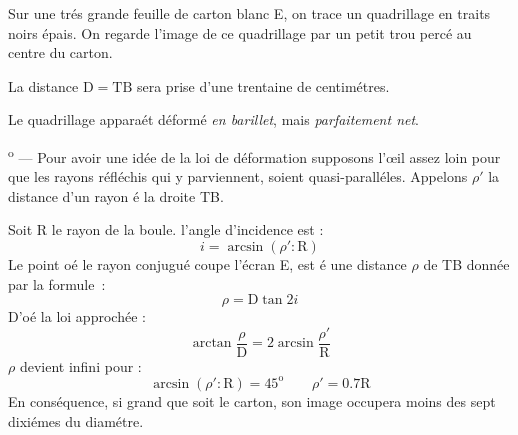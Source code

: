 \documentclass[11pt,frenchb,BCOR10mm,DIV12,bibliography=totoc,parskip=false,smallheadings
    headexclude,footexclude,oneside]{pst-doc}
\newcounter{boua}
\newcommand\itemBoua{\addtocounter{boua}{1}\strut\indent\textit{\theboua}\textsuperscript{o} --- }
\begin{document}
Sur une trés grande feuille de carton blanc E, on trace un
quadrillage en traits noirs épais. On regarde l'image de ce
quadrillage par un petit trou percé au centre du carton.

La distance $\mathrm{D=TB}$ sera prise d'une trentaine de
centimétres.

Le quadrillage apparaét déformé \textit{en barillet}, mais
\textit{parfaitement net}.

\itemBoua
Pour avoir une idée de la loi de déformation supposons l'\oe{}il
assez loin pour que les rayons réfléchis qui y parviennent, soient
quasi-paralléles. Appelons $\rho'$ la distance d'un rayon é la
droite TB.

Soit R le rayon de la boule. l'angle d'incidence est :
$$i=\arcsin(\rho':\mathrm{R})$$
Le point oé le rayon conjugué coupe l'écran E, est é une distance
$\rho$ de TB donnée par la formule~:
$$\rho=\mathrm{D}\tan2i$$
D'oé la loi approchée :
$$\arctan\frac{\rho}{\mathrm{D}}=2\arcsin\frac{\rho'}{\mathrm{R}}$$
$\rho$ devient infini pour :
$$\arcsin(\rho':\mathrm{R})=45^\mathrm{o}\qquad \rho'=0.7\mathrm{R}$$
En conséquence, si grand que soit le carton, son image occupera
moins des sept dixiémes du diamétre.
\end{document}
